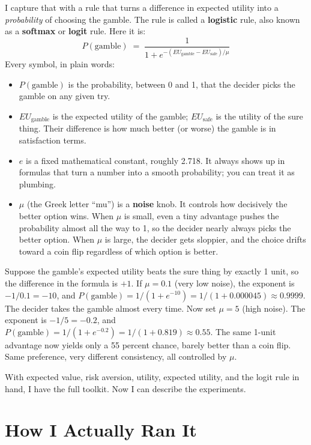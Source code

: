 \documentclass[11pt]{article}
\newcommand{\term}[1]{\textbf{\color{mossdk}#1}}
\begin{document}
I capture that with a rule that turns a difference in expected utility into a \emph{probability} of
choosing the gamble. The rule is called a \term{logistic} rule, also known as a \term{softmax} or
\term{logit} rule. Here it is:
\[
P(\text{gamble}) \;=\; \frac{1}{1 + e^{-(EU_{\text{gamble}} - EU_{\text{safe}})/\mu}}
\]
Every symbol, in plain words:
\begin{itemize}
\item $P(\text{gamble})$ is the probability, between 0 and 1, that the decider picks the gamble on any
given try.
\item $EU_{\text{gamble}}$ is the expected utility of the gamble; $EU_{\text{safe}}$ is the utility of
the sure thing. Their difference is how much better (or worse) the gamble is in satisfaction terms.
\item $e$ is a fixed mathematical constant, roughly 2.718. It always shows up in formulas that turn a
number into a smooth probability; you can treat it as plumbing.
\item $\mu$ (the Greek letter ``mu'') is a \term{noise} knob. It controls how decisively the better
option wins. When $\mu$ is small, even a tiny advantage pushes the probability almost all the way to 1,
so the decider nearly always picks the better option. When $\mu$ is large, the decider gets sloppier,
and the choice drifts toward a coin flip regardless of which option is better.
\end{itemize}

\begin{workbox}
Suppose the gamble's expected utility beats the sure thing by exactly 1 unit, so the difference in the
formula is $+1$. If $\mu = 0.1$ (very low noise), the exponent is $-1/0.1 = -10$, and
$P(\text{gamble}) = 1/(1 + e^{-10}) = 1/(1 + 0.000045) \approx 0.9999$. The decider takes the gamble
almost every time. Now set $\mu = 5$ (high noise). The exponent is $-1/5 = -0.2$, and
$P(\text{gamble}) = 1/(1 + e^{-0.2}) = 1/(1 + 0.819) \approx 0.55$. The same 1-unit advantage now
yields only a 55 percent chance, barely better than a coin flip. Same preference, very different
consistency, all controlled by $\mu$.
\end{workbox}

With expected value, risk aversion, utility, expected utility, and the logit rule in hand, I have the
full toolkit. Now I can describe the experiments.

\section{How I Actually Ran It}
\end{document}
